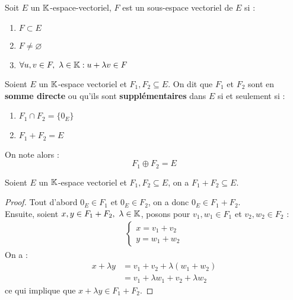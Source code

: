 \begin{definition}
	Soit $E$ un $\mathbb{K}$-espace-vectoriel, $F$ est un sous-espace vectoriel de $E$ si :
	\begin{enumerate}
    		\item $F \subset E$
    		\item $F \neq \varnothing$
    		\item $\forall u, v \in F,\ \lambda \in \mathbb{K} : u + \lambda v \in F$
    	\end{enumerate}
\end{definition}

\begin{definition}
	Soient $E$ un $\mathbb{K}$-espace vectoriel et $F_1, F_2 \subseteq E$. On dit que $F_1$ et $F_2$ sont en \textbf{somme directe} ou qu'ils sont \textbf{supplémentaires} dans $E$ si et seulement si :
	\begin{multicols}{2}
	    \begin{enumerate}
		\item $F_1 \cap F_2 = \{ 0_E \}$
		\item $F_1 + F_2 = E$
	\end{enumerate}
	\end{multicols}
	On note alors :
	\[ F_1 \oplus F_2 = E \]
\end{definition}

\begin{proposition}
	Soient $E$ un $\mathbb{K}$-espace vectoriel et $F_1, F_2 \subseteq E$, on a $F_1 + F_2 \subseteq E$. 
\end{proposition}

\begin{proof}
	Tout d'abord $0_E \in F_1$ et $0_E \in F_2$, on a donc $0_E \in F_1 + F_2$.
	\\
	Ensuite, soient $x, y \in F_1 + F_2,\ \lambda \in \mathbb{K}$, posons pour $v_1, w_1 \in F_1$ et $v_2, w_2 \in F_2$ :
	\begin{align*}
		\begin{cases}
			x = v_1 + v_2 \\
			y = w_1 + w_2
		\end{cases}
	\end{align*}
	On a :
	\begin{align*}
		x + \lambda y &= v_1 + v_2 + \lambda (w_1 + w_2) \\
		&= v_1 + \lambda w_1 + v_2 + \lambda w_2
	\end{align*}
	ce qui implique que $x + \lambda y \in F_1 + F_2$.
\end{proof}

